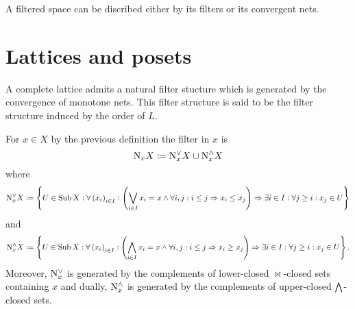 \documentclass[8pt,a4paper]{article}
\begin{document}
A filtered space can be discribed either by its filters or its convergent nets.

\section{Lattices and posets}

\begin{definition}
    A complete lattice admits a natural filter stucture which is generated by the convergence of monotone nets. This filter structure is said to be the filter structure induced by the order of $L$.
\end{definition}

\begin{lemma}
    For $x\in X$ by the previous definition the filter in $x$ is
    $$
    \mathrm{N}_x X\mathrel{\mathrel{\mathop:}\mkern-1.2mu=} \mathrm{N}^{\vee}_x X\cup \mathrm{N}^{\wedge}_x X$$
    where
    $$
    \N^{\join}_x X\defeq
    \set{U\in\Sub X}[\forall\seq{x_i}_{i\in I}:\left(\Join_{i\in I}{x_i}=x\lgand \forall i,j:i\leq j\implies x_i\leq x_j\right)\implies\exists i\in I:\forall j\geq i:x_j\in U]
    $$
    and
    $$
    \N^{\meet}_x X\defeq
    \set{U\in\Sub X}[\forall\seq{x_i}_{i\in I}:\left(\Meet_{i\in I}{x_i}=x\lgand \forall i,j:i\leq j\implies x_i\geq x_j\right)\implies\exists i\in I:\forall j\geq i:x_j\in U].
    $$
    Moreover, $\mathrm{N}^{\vee}_x$ is generated by the complements of lower-closed $\Join$-closed sets containing $x$ and dually, $\mathrm{N}^{\wedge}_x$ is generated by the complements of upper-closed $\mathop\mathrm{\bigwedge}$-closed sets. 
\end{lemma}
\end{document}

